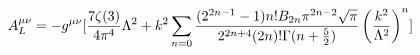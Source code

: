 \begin{equation}
A^{\mu\nu}_L = -g^{\mu\nu}[{{7\zeta(3)} \over {4\pi^4}}\Lambda^2
+ k^2 \sum_{n=0}{{(2^{2n-1} -1)n! B_{2n}
\pi^{2n-2}{\sqrt\pi}}\over {2^{2n+4}(2n)!\Gamma(n +
\frac{5}{2})}}\left({k^2 \over \Lambda^2}\right)^n]
\end{equation}

